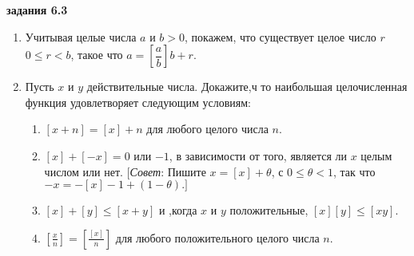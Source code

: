 \documentclass[11pt]{article}
\begin{document}
\newpage
\begin{center}\Large\textbf{задания 6.3}\end{center}
\begin{enumerate}
	\item Учитывая целые числа $ a $ и $ b>0 $, покажем, что существует целое число $ r $ $ 0\le r<b $, такое что $ a=\left[\dfrac{a}{b}\right]b+r. $
	\item Пусть $ x $ и $ y $ действительные числа. Докажите,ч то наибольшая целочисленная функция удовлетворяет следующим условиям:
		\begin{enumerate}
			\item $ \left[ x+n\right] =\left[ x\right] +n $ для любого целого числа $ n. $
			\item $ \left[ x\right] +\left[ -x\right] =0 $ или $ -1 $, в зависимости от того, является ли $ x $ целым числом или нет. [\textit{Совет}: Пишите $ x=\left[ x\right] +\theta $, с $ 0\le\theta<1 $, так что $ -x=-\left[ x\right] -1+\left( 1-\theta\right).]  $
			\item $\left[ x\right] +\left[ y\right] \le \left[ x+y\right]$ и ,когда $ x $ и $ y $ положительные, $\left[ x\right]\left[ y\right] \le\left[ xy\right] $.
			\item $ \left[ \frac{x}{n}\right] =\left[ \frac{\left[ x\right] }{n}\right]  $ для любого положительного целого числа $ n $. 
			

\end{enumerate}
\end{enumerate}
\end{document}
